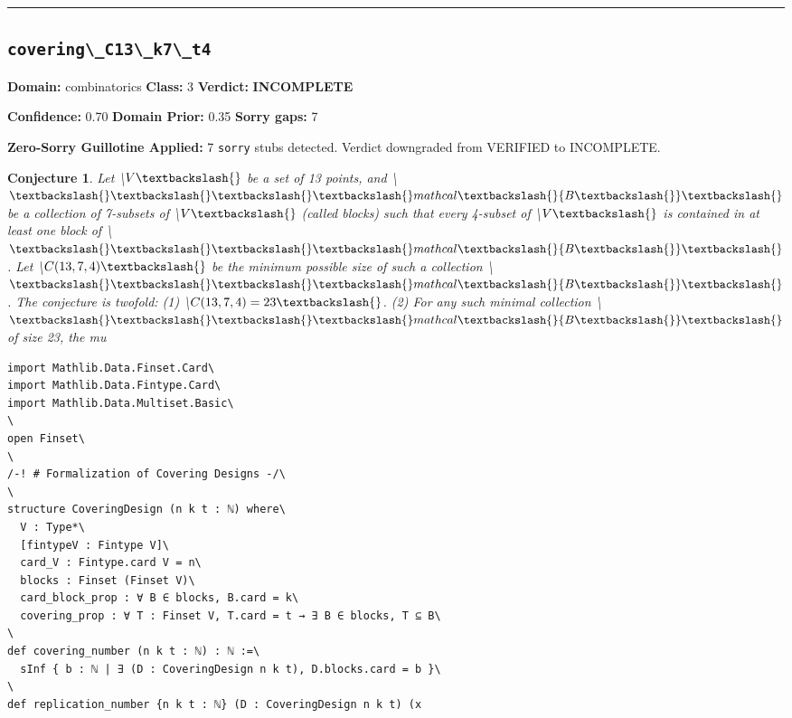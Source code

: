 \documentclass[12pt,a4paper]{article}
\newtheorem{conjecture}{Conjecture}
\begin{document}
\hrule\medskip

\subsection*{\texttt{covering\textbackslash{}_C13\textbackslash{}_k7\textbackslash{}_t4}}

\textbf{Domain:} combinatorics \quad \textbf{Class:} 3 \quad \textbf{Verdict:} \textcolor{incompleteamber}{\textbf{INCOMPLETE}}

\textbf{Confidence:} 0.70 \quad \textbf{Domain Prior:} 0.35 \quad \textbf{Sorry gaps:} 7

\textcolor{sorryred}{\textbf{Zero-Sorry Guillotine Applied:} 7 \texttt{sorry} stubs detected. Verdict downgraded from VERIFIED to INCOMPLETE.}

\begin{conjecture}
Let \textbackslash{}$V\textbackslash{}$ be a set of 13 points, and \textbackslash{}$\textbackslash{}\textbackslash{}\textbackslash{}\textbackslash{}mathcal\textbackslash{}{B\textbackslash{}}\textbackslash{}$ be a collection of 7-subsets of \textbackslash{}$V\textbackslash{}$ (called blocks) such that every 4-subset of \textbackslash{}$V\textbackslash{}$ is contained in at least one block of \textbackslash{}$\textbackslash{}\textbackslash{}\textbackslash{}\textbackslash{}mathcal\textbackslash{}{B\textbackslash{}}\textbackslash{}$. Let \textbackslash{}$C(13, 7, 4)\textbackslash{}$ be the minimum possible size of such a collection \textbackslash{}$\textbackslash{}\textbackslash{}\textbackslash{}\textbackslash{}mathcal\textbackslash{}{B\textbackslash{}}\textbackslash{}$. The conjecture is twofold: (1) \textbackslash{}$C(13, 7, 4) = 23\textbackslash{}$. (2) For any such minimal collection \textbackslash{}$\textbackslash{}\textbackslash{}\textbackslash{}\textbackslash{}mathcal\textbackslash{}{B\textbackslash{}}\textbackslash{}$ of size 23, the mu
\end{conjecture}

\begin{lstlisting}[caption={Lean 4 Sketch (v14 Galois)}]
import Mathlib.Data.Finset.Card\
import Mathlib.Data.Fintype.Card\
import Mathlib.Data.Multiset.Basic\
\
open Finset\
\
/-! # Formalization of Covering Designs -/\
\
structure CoveringDesign (n k t : ℕ) where\
  V : Type*\
  [fintypeV : Fintype V]\
  card_V : Fintype.card V = n\
  blocks : Finset (Finset V)\
  card_block_prop : ∀ B ∈ blocks, B.card = k\
  covering_prop : ∀ T : Finset V, T.card = t → ∃ B ∈ blocks, T ⊆ B\
\
def covering_number (n k t : ℕ) : ℕ :=\
  sInf { b : ℕ | ∃ (D : CoveringDesign n k t), D.blocks.card = b }\
\
def replication_number {n k t : ℕ} (D : CoveringDesign n k t) (x
\end{lstlisting}
\end{document}
